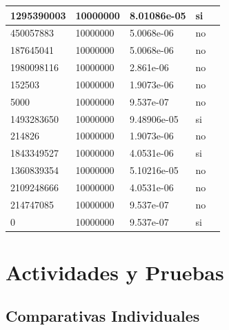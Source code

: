 \documentclass[12pt, fleqn]{article}                             %
\theoremstyle{break}                                            %
\begin{document}
\begin{longtable}{|m{5em}|m{5em}|m{10em}|m{5em}|@{}m{0pt}@{}}
            1295390003& 10000000  & 8.01086e-05 & si &\\[1em]    \hline
            450057883& 10000000  & 5.0068e-06 & no &\\[1em]    \hline
            187645041& 10000000  & 5.0068e-06 & no &\\[1em]    \hline
            1980098116& 10000000  & 2.861e-06 & no &\\[1em]    \hline
            152503& 10000000  & 1.9073e-06 & no &\\[1em]    \hline
            5000& 10000000  & 9.537e-07 & no &\\[1em]    \hline
            1493283650& 10000000  & 9.48906e-05 & si &\\[1em]    \hline
            214826& 10000000  & 1.9073e-06 & no &\\[1em]    \hline
            1843349527& 10000000  & 4.0531e-06 & si &\\[1em]    \hline
            1360839354& 10000000  & 5.10216e-05 & no &\\[1em]    \hline
            2109248666& 10000000  & 4.0531e-06 & no &\\[1em]    \hline
            214747085& 10000000  & 9.537e-07 & no &\\[1em]    \hline
            0& 10000000  & 9.537e-07 & si &\\[1em]    \hline
        \end{longtable}
 




\clearpage
\section{Actividades y Pruebas}


    \subsection{Comparativas Individuales}


\end{document}
